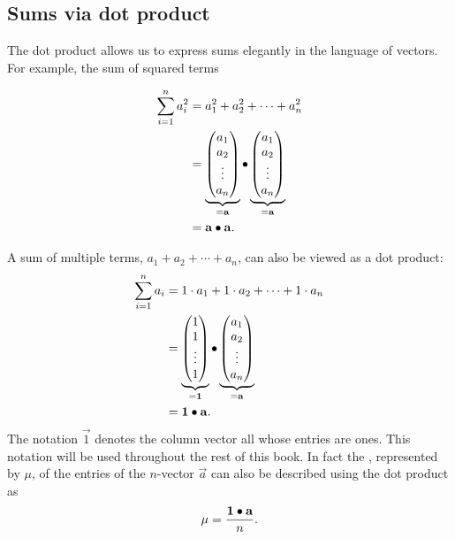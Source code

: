 \documentclass{ximera}
\begin{document}
\subsection{Sums via dot product}

The dot product allows us to express sums elegantly in the language of
vectors. For example, the sum of squared terms

\begin{align*}
  \sum_{i=1}^n a_i^2
  & = a_1^2 + a_2^2 + \cdots + a_n^2 \\
  & =
  \underbrace{
    \begin{pmatrix}
      a_1 \\ a_2 \\ \vdots \\ a_n
  \end{pmatrix}}_{=\mathbf{a}}
  \bullet
  \underbrace{
    \begin{pmatrix}
        a_1 \\ a_2 \\ \vdots \\ a_n
  \end{pmatrix}}_{=\mathbf{a}} \\
  &= \mathbf{a} \bullet \mathbf{a}.
\end{align*}

A sum of multiple terms, $a_1 + a_2 + \cdots + a_n$, can also be
viewed as a dot product:
  \begin{align*}
    \sum_{i=1}^n a_i
    & = 1 \cdot a_1 + 1 \cdot a_2 + \cdots + 1 \cdot a_n \\
    & =
      \underbrace{
      \begin{pmatrix}
        1 \\ 1 \\ \vdots \\ 1
      \end{pmatrix}}_{=\mathbf{1}}
      \bullet
      \underbrace{
      \begin{pmatrix}
        a_1 \\ a_2 \\ \vdots \\ a_n
      \end{pmatrix}}_{=\mathbf{a}} \\
      &= \mathbf{1} \bullet \mathbf{a}.
  \end{align*}
  The notation $\vec{1}$ denotes the column vector all whose entries
  are ones. This notation will be used throughout the rest of this
  book. In fact the , represented by $\mu$, of the entries of the
  $n$-vector $\vec{a}$ can also be described using the dot product as
  \[
  \mu = \frac{\mathbf{1}\bullet\mathbf{a}}{n}.
  \]
\end{document}
